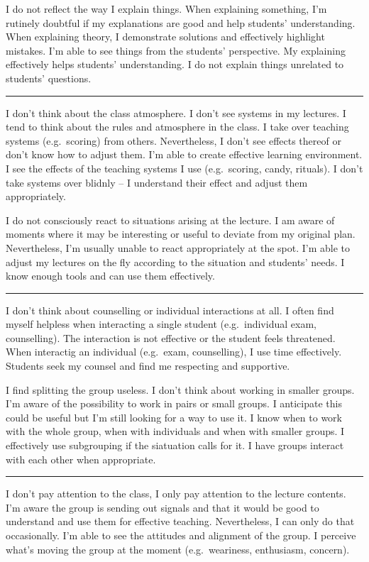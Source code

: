 \newpage
{}
{I do not reflect the way I explain things.}
{When explaining something, I'm rutinely doubtful if my explanations are good and help students' understanding.}
{When explaining theory, I demonstrate solutions and effectively highlight mistakes. I'm able to see things from the students' perspective. My explaining effectively helps students' understanding. I do not explain things unrelated to students' questions.}

\rule{\textwidth}{0.4pt}
{I don't think about the class atmosphere. I don't see systems in my lectures.}
{I tend to think about the rules and atmosphere in the class. I take over teaching systems (e.g.\ scoring) from others. Nevertheless, I don't see effects thereof or don't know how to adjust them.}
{I'm able to create effective learning environment. I see the effects of the teaching systems I use (e.g.\ scoring, candy, rituals). I don't take systems over blidnly -- I understand their effect and adjust them appropriately.}

\newpage
{}
{I do not consciously react to situations arising at the lecture.}
{I am aware of moments where it may be interesting or useful to deviate from my original plan. Nevertheless, I'm usually unable to react appropriately at the spot.}
{I'm able to adjust my lectures on the fly according to the situation and students' needs. I know enough tools and can use them effectively.}

\rule{\textwidth}{0.4pt}
{I don't think about counselling or individual interactions at all.}
{I often find myself helpless when interacting a single student (e.g.\ individual exam, counselling). The interaction is not effective or the student feels threatened.}
{When interactig an individual (e.g.\ exam, counselling), I use time effectively. Students seek my counsel and find me respecting and supportive.}

\newpage
{}
{I find splitting the group useless. I don't think about working in smaller groups.}
{I'm aware of the possibility to work in pairs or small groups. I anticipate this could be useful but I'm still looking for a way to use it.}
{I know when to work with the whole group, when with individuals and when with smaller groups. I effectively use subgrouping if the siatuation calls for it. I have groups interact with each other when appropriate.}

\rule{\textwidth}{0.4pt}
{I don't pay attention to the class, I only pay attention to the lecture contents.}
{I'm aware the group is sending out signals and that it would be good to understand and use them for effective teaching. Nevertheless, I can only do that occasionally.}
{I'm able to see the attitudes and alignment of the group. I perceive what's moving the group at the moment (e.g.\ weariness, enthusiasm, concern).}
